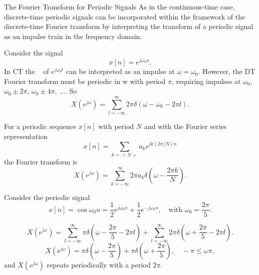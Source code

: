\begin{frame}{The Fourier Transform for Periodic Signals}
As in the continuous-time case, discrete-time periodic signals can be incorporated within
the framework of the discrete-time Fourier transform by interpreting the transform of a
periodic signal as an impulse train in the frequency domain.

Consider the signal
\begin{equation*}
    x[n] = e^{j\omega_0 n}.
\end{equation*}
 In CT the \ft~ of $e^{j\omega_0 t}$ can be interpreted as an impulse at $\omega = \omega_0$. However, the DT Fourier transform must
be periodic in w with period $\pi$, requiring impulses at $\omega_0$,  $\omega_0 \pm 2\pi$, $\omega_0 \pm 4\pi$, $\dots$. So
\begin{equation*}
    X(e^{j\omega}) = \sum_{l=-\infty}^{\infty} 2\pi \delta (\omega - \omega_0 - 2\pi l).
\end{equation*}
    \begin{figure}
        \centering
        
    \end{figure}
\end{frame}

\begin{frame}
    {
    For a periodic sequence $x[n]$ with period $N$ and with the Fourier series representation
    \begin{equation*}
        x[n] = \sum_{k=<N>}a_k e^{jk(2\pi/N)n}
    \end{equation*}
    the Fourier transform is
    \begin{equation*}
        X(e^{j\omega}) = \sum_{k=-\infty}^{\infty} 2\pi a_k\delta \left(\omega - \frac{2\pi k}{N} \right).
    \end{equation*}
    }
\end{frame}


\begin{frame}
    \begin{example}
        Consider the periodic signal
        \begin{equation*}
            x[n] = \cos \omega_0 n = \frac{1}{2}e^{j\omega_0 n} +\frac{1}{2}e^{-j\omega_0 n}, \quad \text{with~} \omega_0 = \frac{2\pi}{5}.
        \end{equation*}
    \end{example}

    {
    	\begin{equation*}
	    	X(e^{j\omega}) = \sum_{l=-\infty}^{\infty} \pi \delta \left(\omega - \frac{2\pi}{5} - 2\pi l\right) +\sum_{l=-\infty}^{\infty} 2\pi \delta \left(\omega + \frac{2\pi}{5} - 2\pi l \right).    		
    	\end{equation*}
    	\pause
    	\begin{equation*}
    		X(e^{j\omega}) = \pi \delta \left(\omega - \frac{2\pi}{5}\right) + \pi \delta \left(\omega + \frac{2\pi}{5}\right), \quad -\pi \leq \omega \pi,
    	\end{equation*}
    	and $X(e^{j\omega})$ repeats periodically with a period $2\pi$.

    }
\end{frame}


